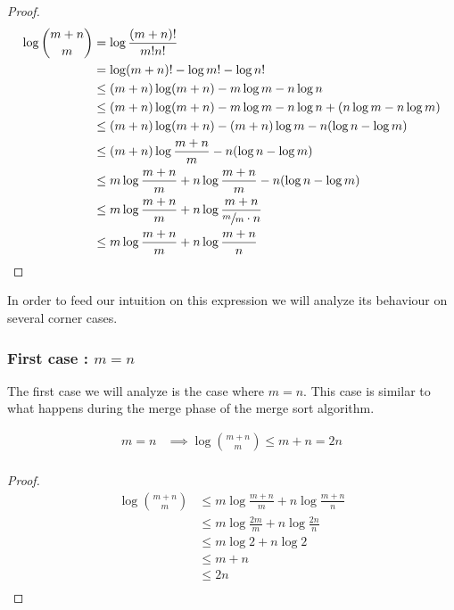\begin{proof}
\begin{align*}
\log\binom{m+n}{m} &= \log\frac{(m+n)!}{m!n!}\\
&= \log(m+n)! - \log m! - \log n!\\
&\leq (m+n) \log(m+n) - m \log m - n \log n\\
&\leq (m+n) \log(m+n) - m \log m - n \log n + (n \log m - n \log m)\\
&\leq (m+n) \log(m+n) - (m+n) \log m - n (\log n - \log m)\\
&\leq (m+n) \log\frac{m+n}{m} - n (\log n - \log m)\\
&\leq m \log\frac{m+n}{m} + n \log\frac{m+n}{m} - n (\log n - \log m)\\
&\leq m \log\frac{m+n}{m} + n \log\frac{m+n}{\sfrac{m}{m} \cdot n}\\
&\leq m \log\frac{m+n}{m} + n \log\frac{m+n}{n}\\
\end{align*}
\end{proof}



In order to feed our intuition on this expression we will analyze its behaviour
on several corner cases.


\subsubsection{First case\texorpdfstring{ : $m = n$}{}}


The first case we will analyze is the case where $m = n$. This case is similar
to what happens during the merge phase of the merge sort algorithm.

\begin{lemma}
\begin{align*}
m = n &\implies \log\binom{m+n}{m} \leq m + n = 2n\\
\end{align*}
\end{lemma}

\begin{proof}
\begin{align*}
\log\binom{m+n}{m} &\leq m \log\frac{m+n}{m} + n \log\frac{m+n}{n}\\
&\leq m \log\frac{2m}{m} + n \log\frac{2n}{n}\\
&\leq m \log 2 + n \log 2\\
&\leq m + n\\
&\leq 2n\\
\end{align*}
\end{proof}

